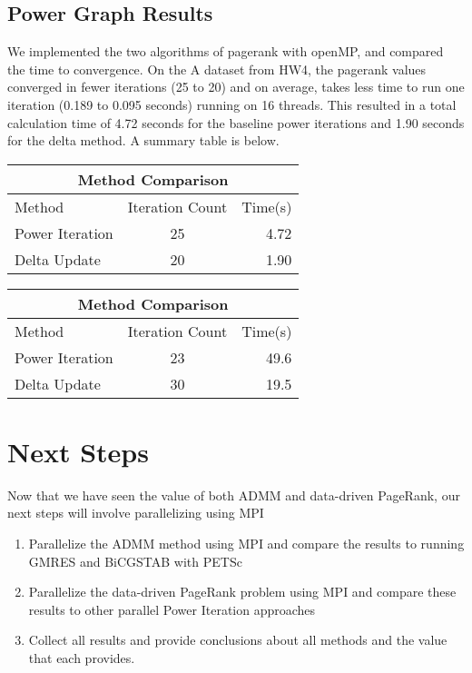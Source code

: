 \documentclass[a4paper,10pt]{article}
\begin{document}
\subsection{Power Graph Results}
We implemented the two algorithms of pagerank with openMP, and compared the time to convergence. On the A dataset from HW4, the pagerank values converged in fewer iterations (25 to 20) and on average, takes less time to run one iteration (0.189 to 0.095 seconds) running on 16 threads. This resulted in a total calculation time of 4.72 seconds for the baseline power iterations and 1.90 seconds for the delta method. A summary table is below.

\begin{center}
\begin{tabular}{l || c | r}
	\hline
	\multicolumn{3}{c}{Method Comparison} \\
	\hline\hline
	Method & Iteration Count & Time(s) \\
	\hline\hline
	Power Iteration & 25 & 4.72 \\
	Delta Update & 20 & 1.90 \\
\end{tabular}
\end{center}


\begin{center}
\begin{tabular}{l || c | r}
	\hline
	\multicolumn{3}{c}{Method Comparison} \\
	\hline\hline
	Method & Iteration Count & Time(s) \\
	\hline\hline
	Power Iteration & 23 & 49.6 \\
	Delta Update & 30 & 19.5 \\
\end{tabular}
\end{center}
\section{Next Steps}

Now that we have seen the value of both ADMM and data-driven PageRank, our next steps will involve parallelizing using MPI

\begin{enumerate}
	\item Parallelize the ADMM method using MPI and compare the results to running GMRES and BiCGSTAB with PETSc
	\item Parallelize the data-driven PageRank problem using MPI and compare these results to other parallel Power Iteration approaches
	\item Collect all results and provide conclusions about all methods and the value that each provides.
\end{enumerate}
\end{document}
